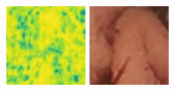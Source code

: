 \documentclass[conference]{IEEEtran}
\begin{document}
\begin{figure}[!t]
        \vfill
        \includegraphics[width=\linewidth]{Figures/906/906_densenet_ssim.jpg}
        
    \endminipage\hfill
        \centering
        \includegraphics[width=\linewidth]{Figures/906/906_RCAN.jpg}
        

\end{figure}
\end{document}
